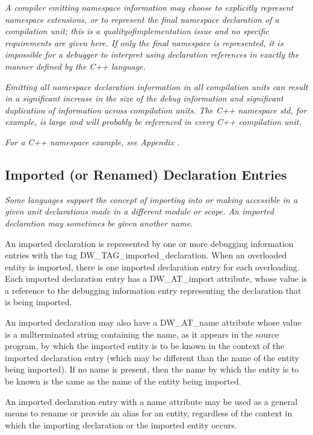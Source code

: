 \textit{A compiler emitting namespace information may choose to
explicitly represent namespace extensions, or to represent the
final namespace declaration of a compilation unit; this is a
quality\dash of\dash implementation issue and no specific requirements
are given here. If only the final namespace is represented,
it is impossible for a debugger to interpret using declaration
references in exactly the manner defined by the C++ language.
}

\textit{Emitting all namespace declaration information in all
compilation units can result in a significant increase in the
size of the debug information and significant duplication of
information across compilation units. The C++ namespace std,
for example, is large and will probably be referenced in
every C++ compilation unit.
}

\textit{For a C++ namespace example, see Appendix .
}



\subsection{Imported (or Renamed) Declaration Entries} 
\label{chap:importedorrenameddeclarationentries}
\textit{Some languages support the concept of importing into or making
accessible in a given unit declarations made in a different
module or scope. An imported declaration may sometimes be
given another name.
}

An imported declaration is represented by one or
more debugging information entries with the tag
DW\_TAG\_imported\_declaration. When an overloaded entity
is imported, there is one imported declaration entry for
each overloading. Each imported declaration entry has a
DW\_AT\_import attribute, whose value is a reference to the
debugging information entry representing the declaration that
is being imported.

An imported declaration may also have a DW\_AT\_name attribute
whose value is a null\dash terminated string containing the
name, as it appears in the source program, by which the
imported entity is to be known in the context of the imported
declaration entry (which may be different than the name of
the entity being imported). If no name is present, then the
name by which the entity is to be known is the same as the
name of the entity being imported.

An imported declaration entry with a name attribute may be
used as a general means to rename or provide an alias for
an entity, regardless of the context in which the importing
declaration or the imported entity occurs.

